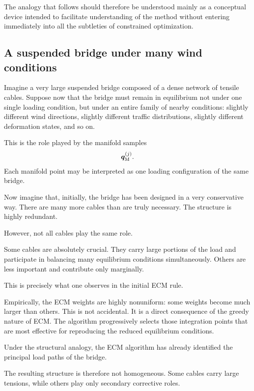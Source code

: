 \documentclass[11pt,a4paper]{article}
\begin{document}
The analogy that follows should therefore be understood mainly as a conceptual
device intended to facilitate understanding of the method without entering
immediately into all the subtleties of constrained optimization.

\subsection{A suspended bridge under many wind conditions}

Imagine a very large suspended bridge composed of a dense network of tensile
cables. Suppose now that the bridge must remain in equilibrium not under one
single loading condition, but under an entire family of nearby conditions:
slightly different wind directions, slightly different traffic distributions,
slightly different deformation states, and so on.

This is the role played by the manifold samples
\[
        \bm q_{\mathrm{M}}^{(j)}.
\]
Each manifold point may be interpreted as one loading configuration of the same
bridge.

Now imagine that, initially, the bridge has been designed in a very conservative
way. There are many more cables than are truly necessary. The structure is
highly redundant.

However, not all cables play the same role.

Some cables are absolutely crucial. They carry large portions of the load and
participate in balancing many equilibrium conditions simultaneously. Others are
less important and contribute only marginally.

This is precisely what one observes in the initial ECM rule.

Empirically, the ECM weights are highly nonuniform:
some weights become much larger than others. This is not accidental. It is a
direct consequence of the greedy nature of ECM. The algorithm progressively
selects those integration points that are most effective for reproducing the
reduced equilibrium conditions.

Under the structural analogy, the ECM algorithm has already identified the
principal load paths of the bridge.

The resulting structure is therefore not homogeneous. Some cables carry large
tensions, while others play only secondary corrective roles.
\end{document}
